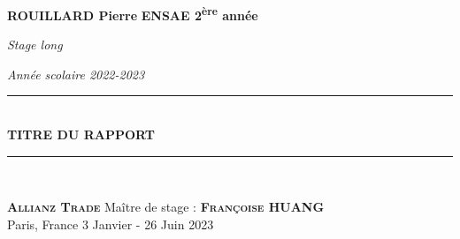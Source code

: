 \newcommand{\HRule}{\rule{\linewidth}{0.5mm}}

\begin{titlepage}
\begin{center}

\begin{minipage}{1\textwidth}
\Large{\textbf{ROUILLARD Pierre}} 
\hfill
\large{\textbf{ENSAE 2\textsuperscript{ère} année}}\par
\vspace{0cm}
\hfill \normalsize{\textit{Stage long}}\par
\hfill \normalsize{\textit{Année scolaire 2022-2023}}  
\end{minipage}

\vspace{8cm}

\begin{center}

\HRule \\[1cm]
{\huge \bfseries{TITRE DU RAPPORT}}\\[0.5cm]
\HRule \\[2.5cm]

\end{center}

\vfill

\begin{minipage}{1\textwidth}
\begin{flushleft}
\large{\textbf{\textsc{Allianz Trade}}} \hfill \small{Maître de stage :} \large{\textbf{\textsc{Françoise HUANG}}} \\ 
\small{Paris, France} \hfill \small{3 Janvier - 26 Juin 2023}
\end{flushleft}
\end{minipage}

\end{center}
\end{titlepage}